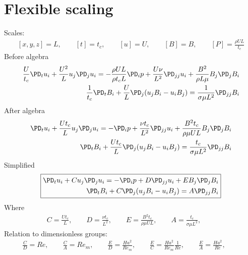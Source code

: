 \documentclass[11pt]{article}
\begin{document}
\section{Flexible scaling}
Scales:
\begin{equation}\begin{aligned}
	[x,y,z] = L, \qquad
	[t] = t_c, \qquad
	[u] = U, \qquad
	[B] = B, \qquad
	[P] = \frac{\rho U L}{t_c}
\end{aligned} \end{equation}
Before algebra
\begin{equation}\begin{aligned}
\frac{U}{t_c} \PD_t u_i+ \frac{U^2}{L} u_j\PD_j u_i =-\frac{\rho U L}{\rho t_c L}\PD_i p+ \frac{U \nu}{L^2} \PD_{jj} u_i + \frac{B^2}{\rho L \mu} B_j \PD_j B_i \\
\frac{1}{t_c} \PD_t B_i + \frac{U}{L} \PD_j (u_j B_i - u_i B_j) = \frac{1}{\sigma \mu L^2} \PD_{jj} B_i
\end{aligned} \end{equation}
After algebra
\begin{equation}\begin{aligned}
\PD_t u_i+ \frac{U t_c}{L} u_j\PD_j u_i =-\PD_i p + \frac{\nu t_c}{L^2} \PD_{jj} u_i + \frac{B^2 t_c}{\rho \mu U L} B_j \PD_j B_i \\
\PD_t B_i + \frac{U t_c}{L} \PD_j (u_j B_i - u_i B_j) = \frac{t_c}{\sigma \mu L^2} \PD_{jj} B_i
\end{aligned} \end{equation}
Simplified
\begin{equation}\boxed{\begin{aligned}
\PD_t u_i+ C u_j\PD_j u_i = - \PD_i p+ D \PD_{jj} u_i + E B_j \PD_j B_i \\
\PD_t B_i + C \PD_j (u_j B_i - u_i B_j) = A \PD_{jj} B_i
\end{aligned}}\end{equation}
Where
\begin{equation}\boxed{\begin{aligned}
	C = \frac{U t_c}{L}, \qquad
	D = \frac{\nu t_c}{L^2}, \qquad
	E = \frac{B^2 t_c}{\rho \mu U L}, \qquad
	A = \frac{t_c}{\sigma \mu L^2}, \qquad
\end{aligned}}\end{equation}
Relation to dimensionless groups:
\begin{equation}\begin{aligned}
	\frac{C}{D} = Re, \qquad
	\frac{C}{A} = Re_m, \qquad
	\frac{E}{D} = \frac{Ha^2}{Re_m}, \qquad
	\frac{E}{C} = \frac{Ha^2}{Re_m} \frac{1}{Re}, \qquad
	\frac{E}{A} = \frac{Ha^2}{Re}, \qquad
\end{aligned} \end{equation}
\end{document}
